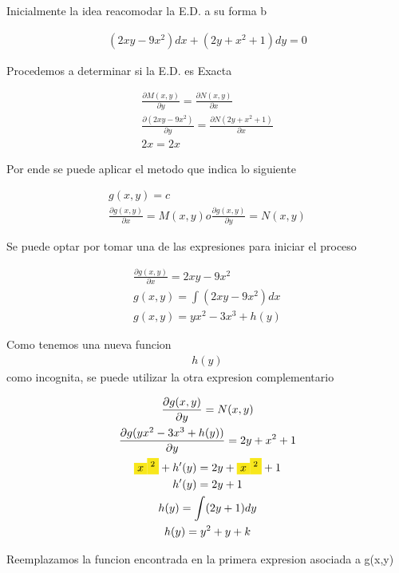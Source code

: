 \documentclass{article}
\begin{document}
Inicialmente la idea reacomodar la E.D. a su forma b


\begin{gather*}
(2xy-9x^{2})dx +(2y+x^{2}+1)dy =0 
\end{gather*}


Procedemos a determinar si la E.D. es Exacta


\begin{gather*}
\frac{\partial M(x,y)}{\partial y} = \frac{\partial N(x,y)}{\partial x} \\
\frac{\partial (2xy-9x^{2})}{\partial y} = \frac{\partial N(2y+x^{2}+1)}{\partial x} \\
2x = 2x
\end{gather*}


Por ende se puede aplicar el metodo que indica lo siguiente


\begin{gather*}
g(x,y) =c \\
\frac{\partial g(x,y)}{\partial x} = M(x,y)   o   \frac{\partial g(x,y)}{\partial y} = N(x,y)
\end{gather*}


Se puede optar por tomar una de las expresiones para iniciar el proceso


\begin{gather*}
\frac{\partial g(x,y)}{\partial x} = 2xy-9x^{2} \\
g(x,y) =\int (2xy-9x^{2}) dx  \\
g(x,y) = yx^{2}-3x^{3} + h(y)
\end{gather*}


Como tenemos una nueva funcion 
\begin{gather*}
h(y)
\end{gather*}
 como incognita, se puede utilizar la otra expresion complementario


\begin{gather*}
\frac{\partial g(x,y)}{\partial y} = N(x,y) \\
\frac{\partial g( yx^{2}-3x^{3} + h(y))}{\partial y} = 2y+x^{2}+1 \\
\text{\colorbox[RGB]{248,231,28}{$x$}}\text{\colorbox[RGB]{248,231,28}{$^{2}$}}+h'(y) = 2y+\text{\colorbox[RGB]{248,231,28}{$x$}}\text{\colorbox[RGB]{248,231,28}{$^{2}$}}+1 \\
h'(y) = 2y+1 \\
h(y) = \int (2y+1)dy \\
h(y) =y^{2}+y + k
\end{gather*}


Reemplazamos la funcion encontrada en la primera expresion asociada a g(x,y)
\end{document}
